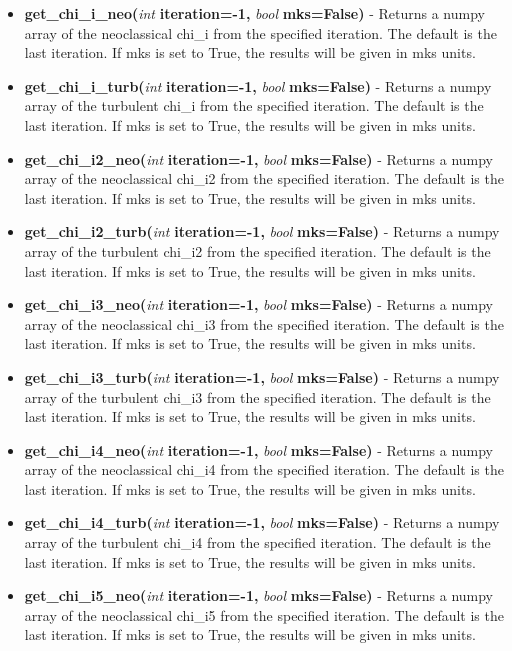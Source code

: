 \documentclass{article}
\begin{document}
\begin{itemize}
\begin{itemize}
\item \textbf{get\_chi\_i\_neo(}\emph{int}\textbf{ iteration=-1,}\emph{ bool}\textbf{ mks=False)} - Returns a numpy array of the neoclassical chi\_i from the specified iteration.  The default is the last iteration.  If mks is set to True, the results will be given in mks units.
\item \textbf{get\_chi\_i\_turb(}\emph{int}\textbf{ iteration=-1,}\emph{ bool}\textbf{ mks=False)} - Returns a numpy array of the turbulent chi\_i from the specified iteration.  The default is the last iteration.  If mks is set to True, the results will be given in mks units.
\item \textbf{get\_chi\_i2\_neo(}\emph{int}\textbf{ iteration=-1,}\emph{ bool}\textbf{ mks=False)} - Returns a numpy array of the neoclassical chi\_i2 from the specified iteration.  The default is the last iteration.  If mks is set to True, the results will be given in mks units.
\item \textbf{get\_chi\_i2\_turb(}\emph{int}\textbf{ iteration=-1,}\emph{ bool}\textbf{ mks=False)} - Returns a numpy array of the turbulent chi\_i2 from the specified iteration.  The default is the last iteration.  If mks is set to True, the results will be given in mks units.
\item \textbf{get\_chi\_i3\_neo(}\emph{int}\textbf{ iteration=-1,}\emph{ bool}\textbf{ mks=False)} - Returns a numpy array of the neoclassical chi\_i3 from the specified iteration.  The default is the last iteration.  If mks is set to True, the results will be given in mks units.
\item \textbf{get\_chi\_i3\_turb(}\emph{int}\textbf{ iteration=-1,}\emph{ bool}\textbf{ mks=False)} - Returns a numpy array of the turbulent chi\_i3 from the specified iteration.  The default is the last iteration.  If mks is set to True, the results will be given in mks units.
\item \textbf{get\_chi\_i4\_neo(}\emph{int}\textbf{ iteration=-1,}\emph{ bool}\textbf{ mks=False)} - Returns a numpy array of the neoclassical chi\_i4 from the specified iteration.  The default is the last iteration.  If mks is set to True, the results will be given in mks units.
\item \textbf{get\_chi\_i4\_turb(}\emph{int}\textbf{ iteration=-1,}\emph{ bool}\textbf{ mks=False)} - Returns a numpy array of the turbulent chi\_i4 from the specified iteration.  The default is the last iteration.  If mks is set to True, the results will be given in mks units.
\item \textbf{get\_chi\_i5\_neo(}\emph{int}\textbf{ iteration=-1,}\emph{ bool}\textbf{ mks=False)} - Returns a numpy array of the neoclassical chi\_i5 from the specified iteration.  The default is the last iteration.  If mks is set to True, the results will be given in mks units.

\end{itemize}
\end{itemize}
\end{document}
